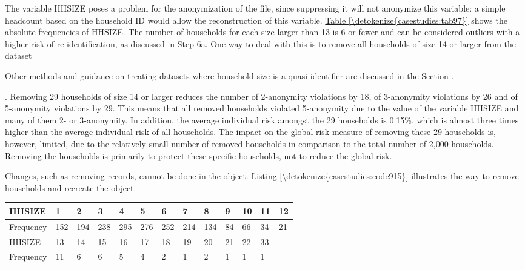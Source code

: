 \documentclass[letterpaper,10pt,english]{sphinxmanual}
\begin{document}

The variable HHSIZE poses a problem for the anonymization of the file,
since suppressing it will not anonymize this variable: a simple
headcount based on the household ID would allow the reconstruction of
this variable. \hyperref[\detokenize{casestudies:tab97}]{Table \ref{\detokenize{casestudies:tab97}}} shows the absolute frequencies of HHSIZE. The
number of households for each size larger than 13 is 6 or fewer and can
be considered outliers with a higher risk of re-identification, as
discussed in Step 6a. One way to deal with this is to remove all
households of size 14 or larger from the dataset %
\begin{footnote}[1]\sphinxAtStartFootnote
Other methods and guidance on treating datasets where household size
is a quasi-identifier are discussed in the Section
.
%
\end{footnote}.
Removing 29 households of size 14 or larger reduces the number of
2-anonymity violations by 18, of 3-anonymity violations by 26 and of
5-anonymity violations by 29. This means that all removed households
violated 5-anonymity due to the value of the variable HHSIZE and many of
them 2- or 3-anonymity. In addition, the average individual risk amongst
the 29 households is 0.15\%, which is almost three times higher than the
average individual risk of all households. The impact on the global risk
measure of removing these 29 households is, however, limited, due to the
relatively small number of removed households in comparison to the total
number of 2,000 households. Removing the households is primarily to
protect these specific households, not to reduce the global risk.

Changes, such as removing records, cannot be done in the
 object. \hyperref[\detokenize{casestudies:code915}]{Listing \ref{\detokenize{casestudies:code915}}} illustrates the way to remove households
and recreate the  object.


\begin{savenotes}\sphinxattablestart
\centering
{}
\label{\detokenize{casestudies:tab97}}\label{\detokenize{casestudies:id27}}
\sphinxaftercaption
\begin{tabulary}{\linewidth}[t]{|T|T|T|T|T|T|T|T|T|T|T|T|T|}
\hline

HHSIZE
&
1
&
2
&
3
&
4
&
5
&
6
&
7
&
8
&
9
&
10
&
11
&
12
\\
\hline
Frequency
&
152
&
194
&
238
&
295
&
276
&
252
&
214
&
134
&
84
&
66
&
34
&
21
\\
\hline
HHSIZE
&
13
&
14
&
15
&
16
&
17
&
18
&
19
&
20
&
21
&
22
&
33
&\\
\hline
Frequency
&
11
&
6
&
6
&
5
&
4
&
2
&
1
&
2
&
1
&
1
&
1
&\\
\hline
\end{tabulary}
\par
\sphinxattableend\end{savenotes}
\end{document}
